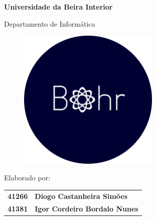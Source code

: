 \thispagestyle{empty}
\setcounter{page}{-1}

\begin{center}
\begin{Huge}
\textbf{Universidade da Beira Interior}
\end{Huge}
\end{center}

\begin{center}
\begin{Huge}
Departamento de Informática
\end{Huge}
\end{center}

\vspace{0,07cm}
\begin{figure}[!htb]
\centering
\includegraphics[width=191pt]{LogoBohr}
\end{figure}

\vspace{0.5cm}
\begin{center}
\begin{Large}
\textbf{\appname}
\end{Large}
\end{center}

\vspace{0.5cm}
\begin{center}
\begin{normalsize}
\begin{large}
Elaborado por:
\end{large}
\end{normalsize}
\end{center}

\vspace{0.2cm}
\begin{center}
\begin{large}
\begin{tabular}{>{\bfseries}r @{~~---~~} >{\bfseries}l}
	41266 & Diogo Castanheira Simões    \\
	41381 & Igor Cordeiro Bordalo Nunes
\end{tabular}
\end{large}
\end{center}

